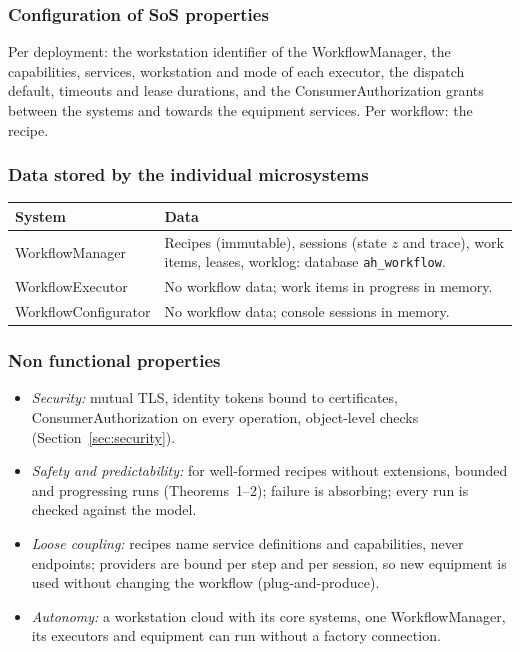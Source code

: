 \documentclass[a4paper]{arrowhead}
\begin{document}
\subsubsection{Configuration of SoS properties}
Per deployment: the workstation identifier of the WorkflowManager, the capabilities, services, workstation and mode of
each executor, the dispatch default, timeouts and lease durations, and the ConsumerAuthorization grants between the
systems and towards the equipment services. Per workflow: the recipe.
\subsubsection{Data stored by the individual microsystems}

{\small
\begin{longtable}{|p{4.0cm}|p{11.8cm}|}

\hline
\rowcolor{gray!33} System & Data \\ \hline
\endhead
WorkflowManager & Recipes (immutable), sessions (state $z$ and trace), work items, leases, worklog: database \texttt{ah\_workflow}. \\ \hline
WorkflowExecutor & No workflow data; work items in progress in memory. \\ \hline
WorkflowConfigurator & No workflow data; console sessions in memory. \\ \hline
\end{longtable}
}

\subsubsection{Non functional properties}
\begin{itemize}
\item \emph{Security:} mutual TLS, identity tokens bound to certificates, ConsumerAuthorization on every operation,
object-level checks (Section~\ref{sec:security}).
\item \emph{Safety and predictability:} for well-formed recipes without extensions, bounded and progressing runs
(Theorems~1--2); failure is absorbing; every run is checked against the model.
\item \emph{Loose coupling:} recipes name service definitions and capabilities, never endpoints; providers are bound
per step and per session, so new equipment is used without changing the workflow (plug-and-produce).
\item \emph{Autonomy:} a workstation cloud with its core systems, one WorkflowManager, its executors and equipment can
run without a factory connection.
\end{itemize}
\end{document}
